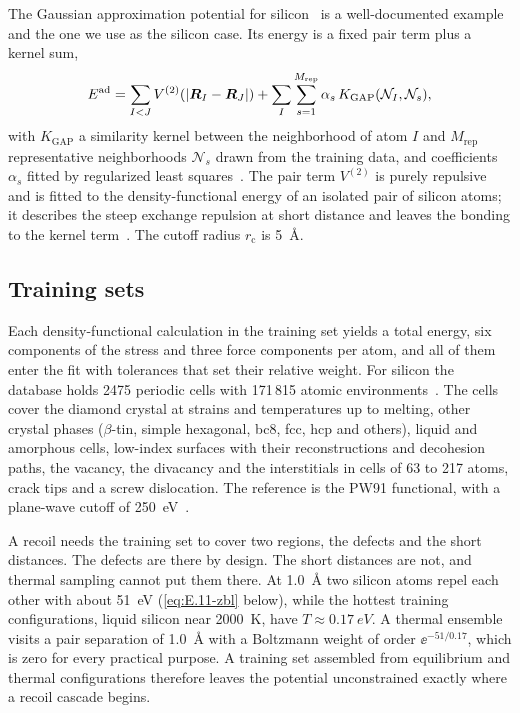 The Gaussian approximation potential for silicon~\cite{bartok2018machine} is a well-documented example and the one we use as the silicon case. Its energy is a fixed pair term plus a kernel sum,
\begin{equation}
  E^{\mathrm{ad}} = \sum_{I<J}V^{(2)}(|\bm{R}_I - \bm{R}_J|) + \sum_I\sum_{s=1}^{M_{\mathrm{rep}}}\alpha_s\,K_{\mathrm{GAP}}(\mathcal{N}_I, \mathcal{N}_s),
  \label{eq:E.11-gap}
\end{equation}
with $K_{\mathrm{GAP}}$ a similarity kernel between the neighborhood of atom $I$ and $M_{\mathrm{rep}}$ representative neighborhoods $\mathcal{N}_s$ drawn from the training data, and coefficients $\alpha_s$ fitted by regularized least squares~\cite[Eq.~(1)]{bartok2018machine}. The pair term $V^{(2)}$ is purely repulsive and is fitted to the density-functional energy of an isolated pair of silicon atoms; it describes the steep exchange repulsion at short distance and leaves the bonding to the kernel term~\cite[Sect.~II\,A]{bartok2018machine}. The cutoff radius $r_{\mathrm{c}}$ is \SI{5}{\angstrom}.

\subsection{Training sets}

Each density-functional calculation in the training set yields a total energy, six components of the stress and three force components per atom, and all of them enter the fit with tolerances that set their relative weight. For silicon the database holds 2475 periodic cells with 171\,815 atomic environments~\cite[Table~I]{bartok2018machine}. The cells cover the diamond crystal at strains and temperatures up to melting, other crystal phases ($\beta$-tin, simple hexagonal, bc8, fcc, hcp and others), liquid and amorphous cells, low-index surfaces with their reconstructions and decohesion paths, the vacancy, the divacancy and the interstitials in cells of 63 to 217 atoms, crack tips and a screw dislocation. The reference is the PW91 functional, with a plane-wave cutoff of \SI{250}{eV}~\cite[Sect.~II\,B]{bartok2018machine}.

A recoil needs the training set to cover two regions, the defects and the short distances. The defects are there by design. The short distances are not, and thermal sampling cannot put them there. At \SI{1.0}{\angstrom} two silicon atoms repel each other with about \SI{51}{eV} (\cref{eq:E.11-zbl} below), while the hottest training configurations, liquid silicon near \SI{2000}{K}, have $T \approx \SI{0.17}{eV}$. A thermal ensemble visits a pair separation of \SI{1.0}{\angstrom} with a Boltzmann weight of order $\ee^{-51/0.17}$, which is zero for every practical purpose. A training set assembled from equilibrium and thermal configurations therefore leaves the potential unconstrained exactly where a recoil cascade begins.

